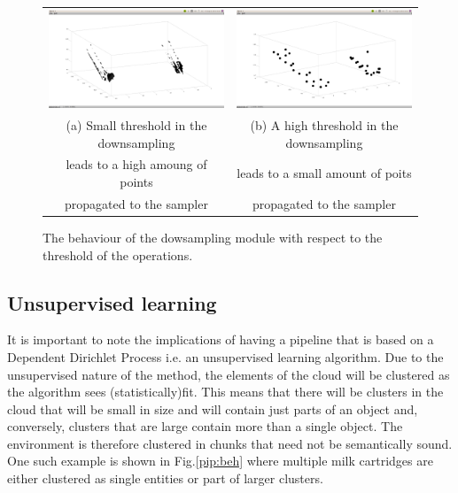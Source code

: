 \documentclass[twoside,hidelinks]{article}
\begin{document}
\begin{figure}[!ht]
\begin{tabular}{cc}
    \includegraphics[width=.4\textwidth]{smalldownsamplinglimit} &  \includegraphics[width=.4\textwidth]{largedownsamplinglimit} \\
    (a) Small threshold in the downsampling  & (b) A high threshold in the downsampling  \\
        leads to  a high amoung of points    &     leads to a small amount of poits \\
        propagated to the sampler            &     propagated to the sampler  \\[6pt]
\end{tabular}
\caption{The behaviour of the dowsampling module with respect to the threshold of the operations.}
  \label{pip:downsample}
\end{figure}
  
\subsection{Unsupervised learning}


It is important to note the implications of having a pipeline that is based on a Dependent Dirichlet Process i.e. an unsupervised learning algorithm. Due to the unsupervised nature of the method, the elements of the cloud will be clustered as the algorithm sees (statistically)fit. This means that there will be clusters in the cloud that will be small in size and will contain just parts of an object and, conversely, clusters that are large contain more than a single object. The environment is therefore clustered in chunks that need not be semantically sound. One such example is shown in Fig.\ref{pip:beh} where multiple milk cartridges are either clustered as single entities or part of larger clusters.
\end{document}
